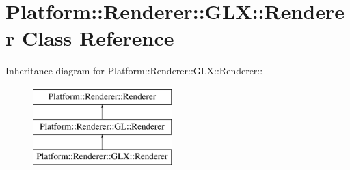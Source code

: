 \hypertarget{classPlatform_1_1Renderer_1_1GLX_1_1Renderer}{
\section{Platform::Renderer::GLX::Renderer Class Reference}
\label{classPlatform_1_1Renderer_1_1GLX_1_1Renderer}
}
Inheritance diagram for Platform::Renderer::GLX::Renderer::\begin{figure}[H]
\begin{center}
\leavevmode
\includegraphics[height=3cm]{classPlatform_1_1Renderer_1_1GLX_1_1Renderer}
\end{center}
\end{figure}
